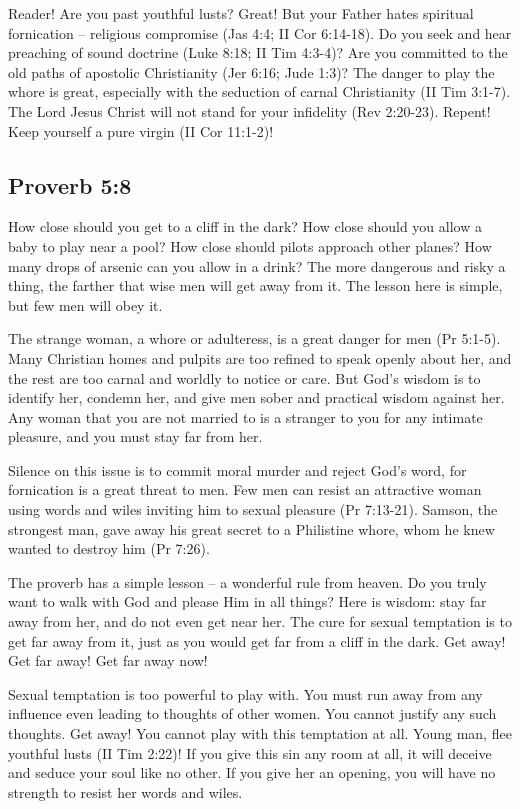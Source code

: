 Reader! Are you past youthful lusts? Great! But your Father hates spiritual fornication – religious compromise (Jas 4:4; II Cor 6:14-18). Do you seek and hear preaching of sound doctrine (Luke 8:18; II Tim 4:3-4)? Are you committed to the old paths of apostolic Christianity (Jer 6:16; Jude 1:3)? The danger to play the whore is great, especially with the seduction of carnal Christianity (II Tim 3:1-7). The Lord Jesus Christ will not stand for your infidelity (Rev 2:20-23). Repent! Keep yourself a pure virgin (II Cor 11:1-2)!

\subsection{Proverb 5:8}
How close should you get to a cliff in the dark? How close should you allow a baby to play near a pool? How close should pilots approach other planes? How many drops of arsenic can you allow in a drink? The more dangerous and risky a thing, the farther that wise men will get away from it. The lesson here is simple, but few men will obey it.

The strange woman, a whore or adulteress, is a great danger for men (Pr 5:1-5). Many Christian homes and pulpits are too refined to speak openly about her, and the rest are too carnal and worldly to notice or care. But God’s wisdom is to identify her, condemn her, and give men sober and practical wisdom against her. Any woman that you are not married to is a stranger to you for any intimate pleasure, and you must stay far from her.

Silence on this issue is to commit moral murder and reject God’s word, for fornication is a great threat to men. Few men can resist an attractive woman using words and wiles inviting him to sexual pleasure (Pr 7:13-21). Samson, the strongest man, gave away his great secret to a Philistine whore, whom he knew wanted to destroy him (Pr 7:26).

The proverb has a simple lesson – a wonderful rule from heaven. Do you truly want to walk with God and please Him in all things? Here is wisdom: stay far away from her, and do not even get near her. The cure for sexual temptation is to get far away from it, just as you would get far from a cliff in the dark. Get away! Get far away! Get far away now!

Sexual temptation is too powerful to play with. You must run away from any influence even leading to thoughts of other women. You cannot justify any such thoughts. Get away! You cannot play with this temptation at all. Young man, flee youthful lusts (II Tim 2:22)! If you give this sin any room at all, it will deceive and seduce your soul like no other. If you give her an opening, you will have no strength to resist her words and wiles.

